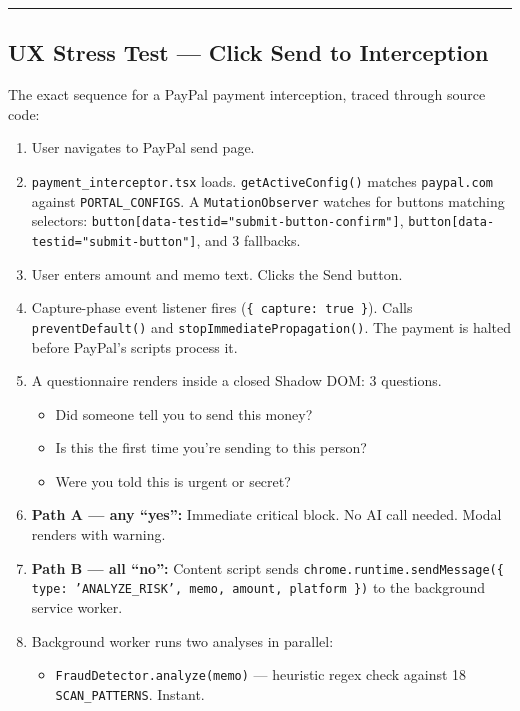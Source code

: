 \documentclass[11pt, letterpaper]{article}
\begin{document}
  \vspace{12pt}
  \hrule
  \vspace{12pt}

  \subsection{UX Stress Test --- Click Send to Interception}

  The exact sequence for a PayPal payment interception, traced through source code:

  \begin{enumerate}
    \item User navigates to PayPal send page.
    \item \texttt{payment\_interceptor.tsx} loads. \texttt{getActiveConfig()} matches \texttt{paypal.com} against \texttt{PORTAL\_CONFIGS}. A \texttt{MutationObserver} watches for buttons matching selectors: \texttt{button[data-testid="submit-button-confirm"]}, \texttt{button[data-testid="submit-button"]}, and 3 fallbacks.
    \item User enters amount and memo text. Clicks the Send button.
    \item Capture-phase event listener fires (\texttt{\{ capture: true \}}). Calls \texttt{preventDefault()} and \texttt{stopImmediatePropagation()}. The payment is halted before PayPal's scripts process it.
    \item A questionnaire renders inside a closed Shadow DOM: 3 questions.
      \begin{itemize}[nosep]
        \item Did someone tell you to send this money?
        \item Is this the first time you're sending to this person?
        \item Were you told this is urgent or secret?
      \end{itemize}
    \item \textbf{Path A --- any ``yes'':} Immediate critical block. No AI call needed. Modal renders with warning.
    \item \textbf{Path B --- all ``no'':} Content script sends \texttt{chrome.runtime.sendMessage(\{ type: 'ANALYZE\_RISK', memo, amount, platform \})} to the background service worker.
    \item Background worker runs two analyses in parallel:
      \begin{itemize}[nosep]
        \item \texttt{FraudDetector.analyze(memo)} --- heuristic regex check against 18 \texttt{SCAN\_PATTERNS}. Instant.

\end{itemize}
\end{enumerate}
\end{document}
